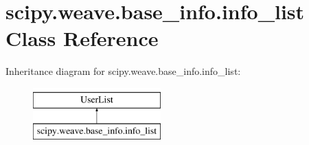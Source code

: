 \hypertarget{classscipy_1_1weave_1_1base__info_1_1info__list}{}\section{scipy.\+weave.\+base\+\_\+info.\+info\+\_\+list Class Reference}
\label{classscipy_1_1weave_1_1base__info_1_1info__list}
Inheritance diagram for scipy.\+weave.\+base\+\_\+info.\+info\+\_\+list\+:\begin{figure}[H]
\begin{center}
\leavevmode
\includegraphics[height=2.000000cm]{classscipy_1_1weave_1_1base__info_1_1info__list}
\end{center}
\end{figure}
